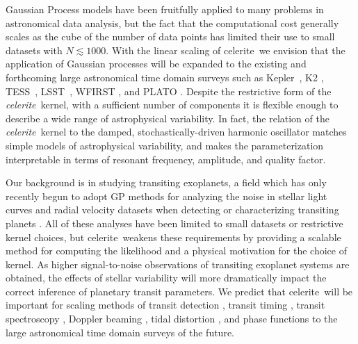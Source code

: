 \documentclass[manuscript, letterpaper]{aastex6}
\makeatletter
\let\origsubsection\subsection
\renewcommand\subsection{\@ifstar{\starsubsection}{\nostarsubsection}}
\newcommand\nostarsubsection[1]{\subsectionprelude\origsubsection{#1}}
\newcommand\starsubsection[1]{\subsectionprelude\origsubsection*{#1}}
\newcommand\subsectionprelude{\vspace{1em}}
\newcommand{\project}[1]{\textsf{#1}}
\newcommand{\kepler}{\project{Kepler}}
\newcommand{\lsst}{\project{LSST}}
\newcommand{\tess}{\project{TESS}}
\newcommand{\celerite}{\project{celerite}}
\newcommand{\celeriteterm}{\emph{celerite}}
\makeatother
\begin{document}
Gaussian Process models have been fruitfully applied to many problems in
astronomical data analysis, but the fact that the computational cost generally
scales as the cube of the number of data points has limited their use to
small datasets with $N \lesssim 1000$.
With the linear scaling of \celerite\, we envision that the application of
Gaussian processes will be expanded to the existing and forthcoming large
astronomical time domain surveys such as \kepler\ \citep{Borucki:2010},
\project{K2} \citep{Howell:2014}, \tess\ \citep{Ricker:2014}, \lsst\
\citep{Ivezic:2008}, \project{WFIRST} \citep{Spergel:2015}, and
\project{PLATO} \citep{Rauer:2014}.
Despite the restrictive form of the \celeriteterm\ kernel, with a sufficient
number of components it is flexible enough to describe a wide range of
astrophysical variability.
In fact, the relation of the \celeriteterm\ kernel to the damped,
stochastically-driven harmonic oscillator matches simple models of
astrophysical variability, and makes the parameterization interpretable in
terms of resonant frequency, amplitude, and quality factor.

Our background is in studying transiting exoplanets, a field which has only
recently begun to adopt GP methods for analyzing the noise in stellar light
curves and radial velocity datasets when detecting or characterizing
transiting planets \citep[for example,][]{Carter:2009, Gibson:2012,
    Haywood:2014, Barclay:2015, Evans:2015, Rajpaul:2015, Aigrain:2016,
    Foreman-Mackey:2016b, Grunblatt:2016, Luger:2016}.
All of these analyses have been limited to small datasets or restrictive
kernel choices, but \celerite\ weakens these requirements by providing a
scalable method for computing the likelihood and a physical motivation for the
choice of kernel.
As higher signal-to-noise observations of transiting exoplanet systems are
obtained, the effects of stellar variability will more dramatically impact the
correct inference of planetary transit parameters.
We predict that \celerite\ will be important for scaling methods of transit
detection \citep{Pope:2016, Foreman-Mackey:2016b}, transit timing
\citep{Agol:2005, Holman:2005}, transit spectroscopy \citep{Brown:2001},
Doppler beaming \citep{Loeb:2003, Zucker:2007}, tidal distortion
\citep{Zucker:2007}, and phase functions \citep{Knutson:2007, Zucker:2007} to
the large astronomical time domain surveys of the future.

\subsection{Other applications and limitations}
\end{document}
